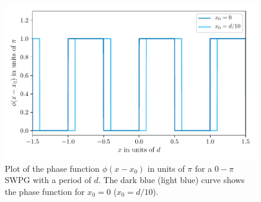 \begin{figure}
	\centering
	\includegraphics[width=1.0\textwidth]{figures/Two_source/swpg.pdf}
	\caption[Plot of SWPG phase function]{Plot of the phase function $\phi(x-x_0)$ in units of $\pi$ for a $0-\pi$ SWPG with a period of $d$.  The dark blue (light blue) curve shows the phase function for $x_0 = 0$ ($x_0=d/10$). }
	\label{fig:swpg}
\end{figure}

